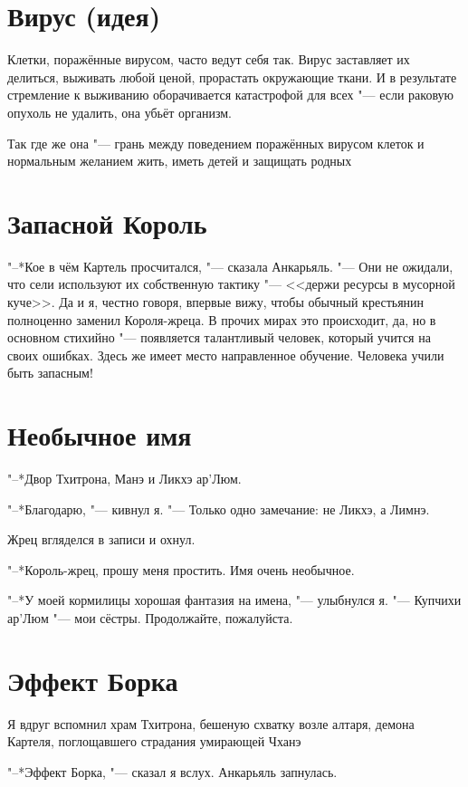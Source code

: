 \documentclass[a4paper,10pt,fleqn]{book}
\newcommand{\ldotst}{\so{...}\xspace}
\newcommand{\ldotsq}{\so{?\hbox{\hspace{-.212em}}..}\xspace}
\begin{document}
\section{Вирус (идея)}

Клетки, поражённые вирусом, часто ведут себя так.
Вирус заставляет их делиться, выживать любой ценой, прорастать окружающие ткани.
И в результате стремление к выживанию оборачивается катастрофой для всех "--- если раковую опухоль не удалить, она убьёт организм.

Так где же она "--- грань между поведением поражённых вирусом клеток и нормальным желанием жить, иметь детей и защищать родных\ldotsq

\section{Запасной Король}

"--*Кое в чём Картель просчитался, "--- сказала Анкарьяль.
"--- Они не ожидали, что сели используют их собственную тактику "--- <<держи ресурсы в мусорной куче>>.
Да и я, честно говоря, впервые вижу, чтобы обычный крестьянин полноценно заменил Короля-жреца.
В прочих мирах это происходит, да, но в основном стихийно "--- появляется талантливый человек, который учится на своих ошибках.
Здесь же имеет место направленное обучение.
Человека учили быть запасным!

\section{Необычное имя}

"--*Двор Тхитрона, Манэ и Ликхэ ар'Люм.

"--*Благодарю, "--- кивнул я.
"--- Только одно замечание: не Ликхэ, а Лимнэ.

Жрец вгляделся в записи и охнул.

"--*Король-жрец, прошу меня простить.
Имя очень необычное.

"--*У моей кормилицы хорошая фантазия на имена, "--- улыбнулся я.
"--- Купчихи ар'Люм "--- мои сёстры.
Продолжайте, пожалуйста.

\section{Эффект Борка}

Я вдруг вспомнил храм Тхитрона, бешеную схватку возле алтаря, демона Картеля, поглощавшего страдания умирающей Чханэ\ldotst

"--*Эффект Борка, "--- сказал я вслух.
Анкарьяль запнулась.
\end{document}
